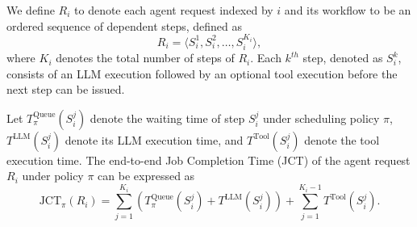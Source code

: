 We define $R_i$ to denote each agent request indexed by $i$ and its workflow to be an ordered sequence of dependent steps, defined as
\begin{equation}
R_i = \langle S_i^1, S_i^2, \ldots, S_i^{K_i} \rangle,
\end{equation}
where $K_i$ denotes the total number of steps of $R_i$.
Each $k^{th}$ step, denoted as $S_i^{k}$, consists of an LLM execution followed by an optional tool
execution before the next step can be issued.


Let $T_{\pi}^{\mathrm{Queue}}(S_i^j)$ denote the waiting time of step $S_i^j$ under scheduling policy $\pi$, $T^{\mathrm{LLM}}(S_i^j)$ denote its LLM execution time, and $T^{\mathrm{Tool}}(S_i^j)$ denote the tool execution time. The end-to-end Job Completion Time (JCT) of the agent request $R_i$ under policy $\pi$ can be expressed as
\begin{equation}
\mathrm{JCT}_{\pi}(R_i) = \sum_{j=1}^{K_i} \left( T_{\pi}^{\mathrm{Queue}}(S_i^j) + T^{\mathrm{LLM}}(S_i^j) \right) + \sum_{j=1}^{K_i-1} T^{\mathrm{Tool}}(S_i^j).
\end{equation}

